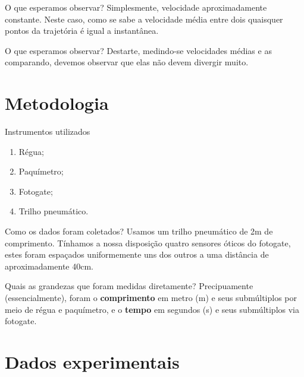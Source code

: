 \documentclass[
  leqno,
  aspectratio=169
]{beamer}
\begin{document}
  \begin{frame}{O que esperamos observar?}
    Simplesmente, velocidade aproximadamente constante. Neste caso, como se sabe a velocidade m\'edia entre dois quaisquer pontos da trajet\'oria \'e igual a instant\^anea. 
  \end{frame}

  \begin{frame}{O que esperamos observar?}
    Destarte, medindo-se velocidades m\'edias e as comparando, devemos observar que elas n\~ao devem divergir muito.
  \end{frame}
  
  \section{Metodologia}
  \begin{frame}{Instrumentos utilizados}
    \begin{enumerate}[label = \Roman*.]
      \item{%
        R\'egua;
      }
      \item{%
        Paqu\'imetro;
      }
      \item{%
        Fotogate;
      }
      \item{%
        Trilho pneum\'atico.
      }
    \end{enumerate}
  \end{frame}

  \begin{frame}{Como os dados foram coletados?}
    Usamos um trilho pneum\'atico de 2m de comprimento. T\'inhamos a nossa disposi\c c\~ao quatro sensores \'oticos do fotogate, estes foram espa\c cados uniformemente uns dos outros a uma dist\^ancia de aproximadamente 40cm.
  \end{frame}
  
  \begin{frame}{Quais as grandezas que foram medidas diretamente?}
    Precipuamente (essencialmente), foram o {\bf comprimento} em metro (m) e seus sub\-m\'ultiplos por meio de r\'egua e paqu\'imetro, e o {\bf tempo} em segundos (s) e seus subm\'ultiplos via fotogate.
  \end{frame}

  \section{Dados experimentais}
\end{document}
